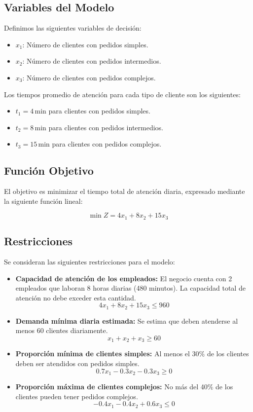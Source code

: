 \documentclass[12pt]{article}
\begin{document}
\subsection{Variables del Modelo}

Definimos las siguientes variables de decisión:

\begin{itemize}
  \item \( x_1 \): Número de clientes con pedidos simples.
  \item \( x_2 \): Número de clientes con pedidos intermedios.
  \item \( x_3 \): Número de clientes con pedidos complejos.
\end{itemize}

Los tiempos promedio de atención para cada tipo de cliente son los siguientes:

\begin{itemize}
  \item \( t_1 = 4 \, \text{min} \) para clientes con pedidos simples.
  \item \( t_2 = 8 \, \text{min} \) para clientes con pedidos intermedios.
  \item \( t_3 = 15 \, \text{min} \) para clientes con pedidos complejos.
\end{itemize}

\subsection{Función Objetivo}

El objetivo es minimizar el tiempo total de atención diaria, expresado mediante la siguiente función lineal:

\[
\min Z = 4x_1 + 8x_2 + 15x_3
\]

\subsection{Restricciones}

Se consideran las siguientes restricciones para el modelo:

\begin{itemize}
  \item \textbf{Capacidad de atención de los empleados:} El negocio cuenta con 2 empleados que laboran 8 horas diarias (480 minutos). La capacidad total de atención no debe exceder esta cantidad.
  \[
  4x_1 + 8x_2 + 15x_3 \leq 960
  \]
  \item \textbf{Demanda mínima diaria estimada:} Se estima que deben atenderse al menos 60 clientes diariamente.
  \[
  x_1 + x_2 + x_3 \geq 60
  \]
  \item \textbf{Proporción mínima de clientes simples:} Al menos el 30\% de los clientes deben ser atendidos con pedidos simples.
  \[
  0.7x_1 - 0.3x_2 - 0.3x_3 \geq 0
  \]
  \item \textbf{Proporción máxima de clientes complejos:} No más del 40\% de los clientes pueden tener pedidos complejos.
  \[
  -0.4x_1 - 0.4x_2 + 0.6x_3 \leq 0
  \]
\end{itemize}
\end{document}
